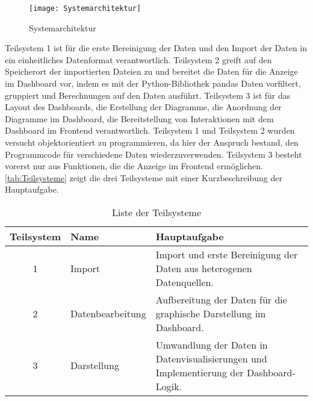     \begin{figure}[H]
        \centering
            \texttt{[image: Systemarchitektur]}
            \caption{Systemarchitektur}
            \label{fig:Systemarchitektur}
    \end{figure}

    Teilsystem 1 ist für die erste Bereinigung der Daten und den Import der Daten in ein einheitliches Datenformat verantwortlich. 
    Teilsystem 2 greift auf den Speicherort der importierten Dateien zu und bereitet die Daten für die Anzeige im Dashboard vor, 
    indem es mit der Python-Bibliothek pandas Daten vorfiltert, gruppiert und Berechnungen auf den Daten ausführt. Teilsystem 3 ist für das Layout des Dashboards, 
    die Erstellung der Diagramme, die Anordnung der Diagramme im Dashboard, die Bereitstellung von Interaktionen mit dem Dashboard im Frontend
    verantwortlich. Teilsystem 1 und Teilsystem 2 wurden versucht objektorientiert zu programmieren, da hier der Anspruch bestand, den Programmcode
    für verschiedene Daten wiederzuverwenden. Teilsystem 3 besteht vorerst nur aus Funktionen, die die Anzeige im Frontend ermöglichen.
    \autoref{tab:Teilsysteme} zeigt die drei Teilsysteme mit einer Kurzbeschreibung der Hauptaufgabe.

       \begingroup
            \setlength{\tabcolsep}{4pt} %
            \renewcommand{\arraystretch}{1.5}
            \begin{table}[h]
                \centering
                \begin{adjustbox}{max width=\textwidth}
                \Huge
                \begin{tabular}{cll}
                   \toprule
                   \textbf{Teilsystem}             & Name   &{Hauptaufgabe} \\
                   \midrule     
                            1                      &Import  &Import und erste Bereinigung der Daten aus heterogenen Datenquellen.\\
                            2                      &Datenbearbeitung     &Aufbereitung der Daten für die graphische Darstellung im Dashboard.\\
                            3                      &Darstellung          &Umwandlung der Daten in Datenvisualisierungen und Implementierung der Dashboard-Logik.\\

                    \bottomrule
                \end{tabular}
                \end{adjustbox}
                \caption{%
                    Liste der Teilsysteme
                \label{tab:Teilsysteme}
                }
                 \end{table}
            \endgroup
    

